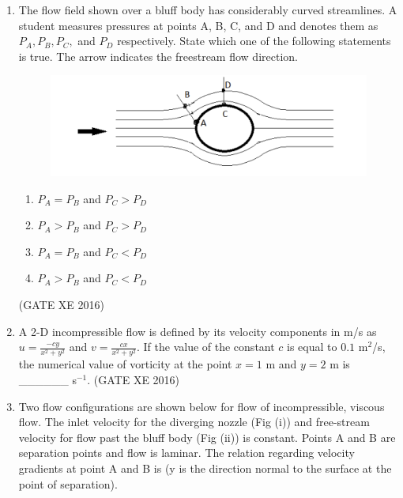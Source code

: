 \documentclass[12pt]{article}
\begin{document}
\begin{enumerate}
\item The flow field shown over a bluff body has considerably curved streamlines. A student measures pressures at points A, B, C, and D and denotes them as $P_A, P_B, P_C,$ and $P_D$ respectively. State which one of the following statements is true. The arrow indicates the freestream flow direction.  

\begin{figure}[H]
    \centering
    \includegraphics[width=0.5\columnwidth]{figs/ass3_b_q6.png}
    \caption{}
    \label{fig:placeholder}
\end{figure}
\begin{enumerate}
\item $P_A = P_B$ and $P_C > P_D$
\item $P_A > P_B$ and $P_C > P_D$
\item $P_A = P_B$ and $P_C < P_D$
\item $P_A > P_B$ and $P_C < P_D$
\end{enumerate}
(GATE XE 2016)

\item A 2-D incompressible flow is defined by its velocity components in m/s as $u = \frac{-cy}{x^2+y^2}$ and $v = \frac{cx}{x^2+y^2}$. If the value of the constant $c$ is equal to $0.1$ m$^2$/s, the numerical value of vorticity at the point $x=1$ m and $y=2$ m is \_\_\_\_\_\_ s$^{-1}$.  
(GATE XE 2016)

\item Two flow configurations are shown below for flow of incompressible, viscous flow. The inlet velocity for the diverging nozzle (Fig (i)) and free-stream velocity for flow past the bluff body (Fig (ii)) is constant. Points A and B are separation points and flow is laminar. The relation regarding velocity gradients at point A and B is (y is the direction normal to the surface at the point of separation).  


\end{enumerate}
\end{document}
